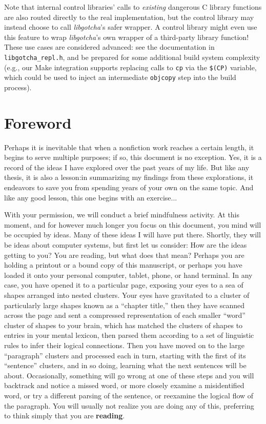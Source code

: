 \documentclass[12pt,letterpaper,openright]{report}
\begin{document}
Note that internal control libraries' calls to \textit{existing} dangerous C library functions are also
routed directly to the real implementation, but the control library may instead choose to call
\textit{libgotcha}'s safer wrapper.  A control library might even use this feature to wrap \textit{libgotcha}'s
own wrapper of a third-party library function!  These use cases are considered advanced: see the
documentation in \texttt{libgotcha\_repl.h}, and be prepared for some additional build system complexity
(e.g., our Make integration supports replacing calls to \texttt{cp} via the \texttt{\$(CP)} variable, which could
be used to inject an intermediate \texttt{objcopy} step into the build process).


\chapter*{Foreword}

Perhaps it is inevitable that when a nonfiction work reaches a certain length, it
begins to serve multiple purposes; if so, this document is no exception.  Yes, it is
a record of the ideas I have explored over the past years of my life.  But like any
thesis, it is also a lesson:\@ in summarizing my findings from these explorations, it
endeavors to save you from spending years of your own on the same topic.  And like
any good lesson, this one begins with an exercise...

With your permission, we will conduct a brief mindfulness activity.  At this moment,
and for however much longer you focus on this document, you mind will be occupied by
ideas.  Many of these ideas I will have put there.  Shortly, they will be ideas about
computer systems, but first let us consider:  How are the ideas getting to you?  You
are reading, but what does that mean?  Perhaps you are holding a printout or a bound
copy of this manuscript, or perhaps you have loaded it onto your personal computer,
tablet, phone, or hand terminal.  In any case, you have opened it to a particular
page, exposing your eyes to a sea of shapes arranged into nested clusters.  Your eyes
have gravitated to a cluster of particularly large shapes known as a ``chapter
title,'' then they have scanned across the page and sent a compressed representation
of each smaller ``word'' cluster of shapes to your brain, which has matched the
clusters of shapes to entries in your mental lexicon, then parsed them according to a
set of linguistic rules to infer their logical connections.  Then you have moved on
to the large ``paragraph'' clusters and processed each in turn, starting with the
first of its ``sentence'' clusters, and in so doing, learning what the next sentences
will be about.  Occasionally, something will go wrong at one of these steps and you
will backtrack and notice a missed word, or more closely examine a misidentified
word, or try a different parsing of the sentence, or reexamine the logical flow of
the paragraph.  You will usually not realize you are doing any of this, preferring
to think simply that you are \textbf{reading}.
\end{document}

